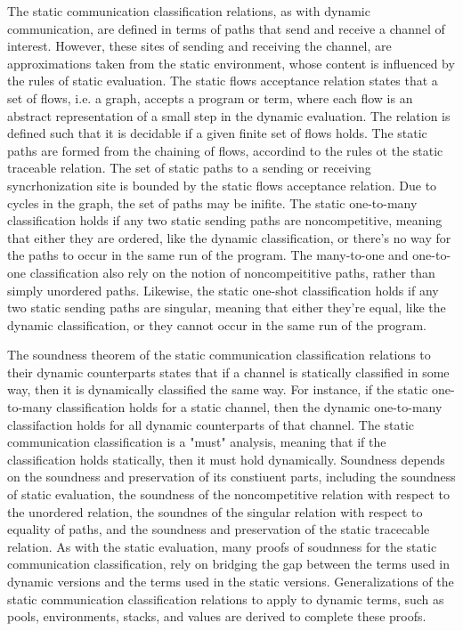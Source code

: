 \documentclass[letterpaper, 11pt]{extarticle}
\begin{document}
The static communication classification relations, as with dynamic communication, are defined in terms of paths
that send and receive a channel of interest. However, these sites of sending and receiving the channel, are approximations
taken from the static environment, whose content is influenced by the rules of static evaluation.
The static flows acceptance relation states that a set of flows, i.e. a graph, accepts a program or term, where each flow is
an abstract representation of a small step in the dynamic evaluation.  The relation is defined such that
it is decidable if a given finite set of flows holds. The static paths are formed from the chaining of flows, accordind
to the rules ot the static traceable relation.
The set of static paths to a sending or receiving syncrhonization site is bounded by the static flows acceptance
relation. Due to cycles in the graph, the set of paths may be inifite. 
The static one-to-many classification holds if any two static sending paths are noncompetitive, meaning
that either they are ordered, like the dynamic classification, or there's no way for the paths to occur in the same run
of the program. The many-to-one and one-to-one classification also rely on the notion of noncompeititive paths, rather than
simply unordered paths. Likewise, the static one-shot classification holds if any two static sending paths are singular,
meaning that either they're equal, like the dynamic classification, or they cannot occur in the same run of the program.

The soundness theorem of the static communication classification relations to their dynamic counterparts states that if
a channel is statically classified in some way, then it is dynamically classified the same way.  For instance, if the
static one-to-many classification holds for a static channel, then the dynamic one-to-many classifaction holds for
all dynamic counterparts of that channel.  The static communication classification is a "must" analysis, meaning that
if the classification holds statically, then it must hold dynamically. Soundness depends on the soundness and preservation
of its constiuent parts,
including the soundness of static evaluation, the soundness of the noncompetitive relation with respect to
the unordered relation, the soundnes of the singular relation with respect to equality of paths,
and the soundness and preservation of the static tracecable relation. As with the static evaluation, many proofs of
soudnness for the static communication classification, rely on bridging the gap between the terms used in dynamic
versions and the terms used in the static versions. Generalizations of the static communication classification relations to
apply to dynamic terms, such as pools, environments, stacks, and values are derived to complete these proofs.
\end{document}
